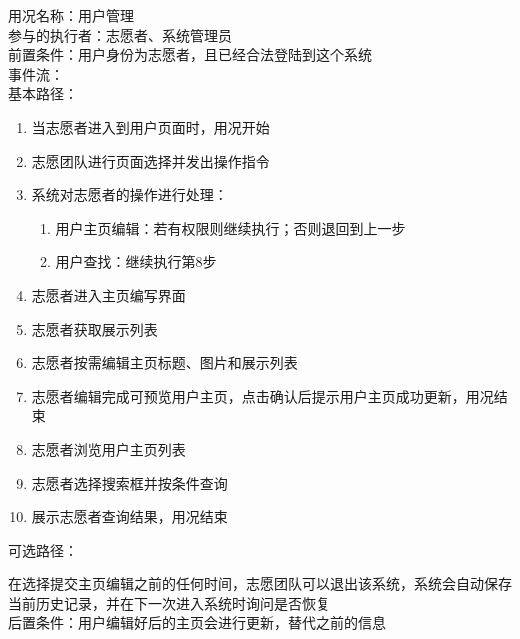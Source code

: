 
\begin{framed}
\noindent
用况名称：用户管理\\
参与的执行者：志愿者、系统管理员\\
前置条件：用户身份为志愿者，且已经合法登陆到这个系统\\
事件流：\\
基本路径：
\begin{enumerate}[itemsep=2pt,topsep=0pt,parsep=0pt,itemindent=1em]
    \item 当志愿者进入到用户页面时，用况开始
    \item 志愿团队进行页面选择并发出操作指令
    \item 系统对志愿者的操作进行处理：
    \begin{enumerate}[itemsep=2pt,topsep=0pt,parsep=0pt,itemindent=1em]
          \item 用户主页编辑：若有权限则继续执行；否则退回到上一步
          \item 用户查找：继续执行第8步
      \end{enumerate}
    \item 志愿者进入主页编写界面
    \item 志愿者获取展示列表
    \item 志愿者按需编辑主页标题、图片和展示列表
    \item 志愿者编辑完成可预览用户主页，点击确认后提示用户主页成功更新，用况结束
    \item 志愿者浏览用户主页列表
    \item 志愿者选择搜索框并按条件查询
    \item 展示志愿者查询结果，用况结束
\end{enumerate}
\noindent
可选路径：\par
    在选择提交主页编辑之前的任何时间，志愿团队可以退出该系统，系统会自动保存当前历史记录，并在下一次进入系统时询问是否恢复\\
后置条件：用户编辑好后的主页会进行更新，替代之前的信息
\end{framed}

